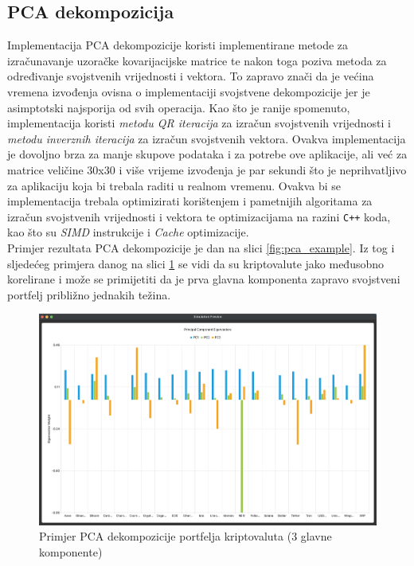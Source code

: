 \documentclass[zavrsnirad, upload]{fer}
\begin{document}
\subsection{PCA dekompozicija}
\label{sek:pca_rezultati}

Implementacija PCA dekompozicije koristi implementirane metode
za izračunavanje uzoračke kovarijacijske matrice te nakon toga poziva
metoda za određivanje svojstvenih vrijednosti i vektora. To zapravo znači
da je većina vremena izvođenja ovisna o implementaciji svojstvene dekompozicije
jer je asimptotski najsporija od svih operacija. Kao što je ranije spomenuto,
implementacija koristi \emph{metodu QR iteracija} za izračun svojstvenih
vrijednosti
i \emph{metodu inverznih iteracija} za izračun svojstvenih vektora.
Ovakva implementacija je dovoljno brza za manje skupove podataka i za
potrebe ove aplikacije, ali već za matrice veličine 30x30 i više
vrijeme izvođenja je par sekundi što je neprihvatljivo za
aplikaciju koja bi trebala raditi u realnom vremenu. Ovakva bi se
implementacija trebala optimizirati korištenjem i pametnijih algoritama
za izračun svojstvenih vrijednosti i vektora te optimizacijama na
razini \texttt{C++} koda, kao što su \emph{SIMD} instrukcije i \emph{Cache}
optimizacije.\\
Primjer rezultata PCA dekompozicije je dan na slici \ref{fig:pca_example}.
Iz tog i sljedećeg primjera danog na slici \ref{fig:pca_example2}
se vidi da su kriptovalute jako međusobno korelirane i može se primijetiti
da je prva glavna komponenta zapravo svojstveni portfelj približno
jednakih težina.
\begin{figure}[H]
    \centering
    \includegraphics[width=1.0\textwidth]{Figures/pca_example2.png}
    \caption{Primjer PCA dekompozicije portfelja kriptovaluta (3 glavne komponente)}
    \label{fig:pca_example2}
\end{figure}
\end{document}

